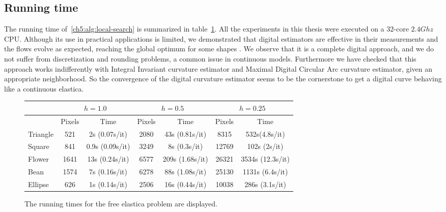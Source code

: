 \subsection{Running time}
\label{ch5:subsec:running-time}

The running time of~\cref{ch5:alg:local-search} is summarized in table~\cref{tab:summary-local-comb-rtime}. All the experiments in this thesis were executed on a $32$-core $2.4Ghz$ CPU. Although its use in practical applications is
limited, we demonstrated that digital estimators are effective in their measurements and the flows evolve as expected, reaching the global optimum for some shapes . We
observe that it is a complete digital approach, and we do not suffer from discretization and rounding problems, a common
issue in continuous models.  Furthermore we have checked that this approach works indifferently with Integral Invariant
curvature estimator and Maximal Digital Circular Arc curvature estimator, given an appropriate neighborhood. So the convergence of the digital curvature
estimator seems to be the cornerstone to get a digital curve behaving like a continuous elastica. 

\begin{figure}[h!]
\center
\captionsetup{type=table}
\footnotesize
\begin{tabular}{|l|c|c|c|c|c|c|}
\hline
& \multicolumn{2}{c|}{$h=1.0$} & \multicolumn{2}{c|}{$h=0.5$} & \multicolumn{2}{c|}{$h=0.25$}\\
\hline
& Pixels & Time & Pixels & Time & Pixels & Time\\
\hline
Triangle & 521 & 2s (0.07s/it)  & 2080 & 43s (0.81s/it) & 8315 & 532s(4.8s/it)\\
Square & 841 & 0.9s (0.09s/it) & 3249 & 8s (0.3s/it) & 12769 & 102s (2s/it)\\
Flower & 1641 & 13s (0.24s/it) & 6577 & 209s (1.68s/it) & 26321 & 3534s (12.3s/it)\\
Bean  & 1574 & 7s (0.16s/it) & 6278 & 88s (1.08s/it) & 25130 & 1131s (6.4s/it)\\
Ellipse  & 626 & 1s (0.14s/it) & 2506 & 16s (0.44s/it) & 10038 & 286s (3.1s/it)\\
\hline
\end{tabular}
\caption{ The running times for the free elastica problem are displayed. }
\label{tab:summary-local-comb-rtime} 
\end{figure}





